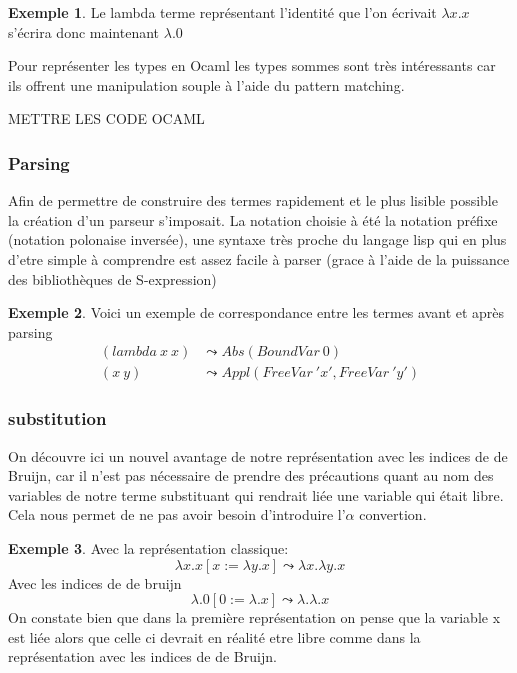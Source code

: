 \documentclass {article}
\theoremstyle{definition}
\newtheorem{example}{Exemple}
\theoremstyle{remark}
\begin{document}
\begin{example}
  Le lambda terme représentant l'identité que l'on écrivait \(\lambda x.x\) s'écrira donc maintenant \(\lambda.0\)
\end{example}
Pour représenter les types en Ocaml les types sommes sont très intéressants car 
ils offrent une manipulation souple à l'aide du pattern matching.

METTRE LES CODE OCAML




\subsubsection{Parsing}
Afin de permettre de construire des termes rapidement et le plus lisible 
possible la création d'un parseur s'imposait.
La notation choisie à été la notation préfixe (notation polonaise inversée),
une syntaxe très proche du langage lisp qui en plus d'etre simple à comprendre
est assez facile à parser (grace à l'aide de la puissance des bibliothèques
de S-expression)
\begin{example}
  Voici un exemple de correspondance entre les termes avant et après parsing
  \begin{align*}
    (lambda\: x \: x) & \leadsto Abs(BoundVar\: 0) \\
    (x\: y) & \leadsto Appl(FreeVar\: 'x',FreeVar\: 'y')       
  \end{align*}
\end{example}



\subsubsection{substitution}
On découvre ici un nouvel avantage de notre représentation avec les indices de
de Bruijn, car il n'est pas nécessaire de prendre des précautions quant au
nom des variables de notre terme substituant %
qui rendrait liée une variable qui était libre. Cela nous permet de ne pas 
avoir besoin d'introduire l'\(\alpha\) convertion.

\begin{example}
  Avec la représentation classique: 
  \[ 
  \lambda x.x[x := \lambda y.x]\leadsto\lambda x.\lambda y.x
  \]
  Avec les indices de de bruijn
  \[ 
  \lambda.0[0 := \lambda.x]\leadsto\lambda.\lambda.x
  \]
  On constate bien que dans la première représentation on pense que la variable
  x est liée alors que celle ci devrait en réalité etre libre comme dans la 
  représentation avec les indices de de Bruijn.
\end{example}
\end{document}
